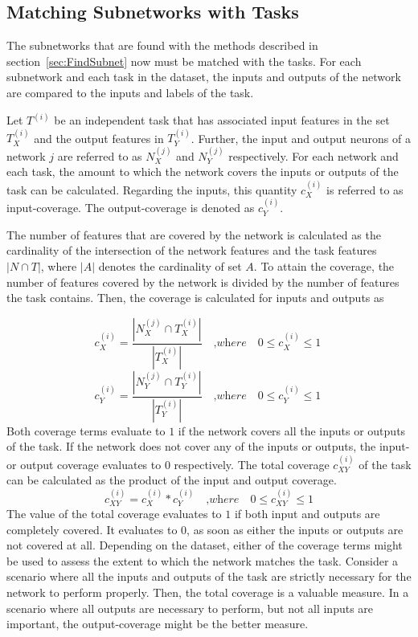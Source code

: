 \subsection{Matching Subnetworks with Tasks}
The subnetworks that are found with the methods described in section~\ref{sec:FindSubnet} now must be matched with the tasks.
For each subnetwork and each task in the dataset, the inputs and outputs of the network are compared to the inputs and labels of the task.

Let $T^{(i)}$ be an independent task that has associated input features in the set $T^{(i)}_X$ and the output features in $T^{(i)}_Y$.
Further, the input and output neurons of a network $j$ are referred to as $N^{(j)}_X$ and $N^{(j)}_Y$ respectively.
For each network and each task, the amount to which the network covers the inputs or outputs of the task can be calculated.
Regarding the inputs, this quantity $c^{(i)}_X$ is referred to as input-coverage. The output-coverage is denoted as $c^{(i)}_Y$.

The number of features that are covered by the network is calculated as the cardinality of the intersection of the network features and the task features $ |N \cap T|$, where  $|A|$ denotes the cardinality of set $A$.
To attain the coverage, the number of features covered by the network is divided by the number of features the task contains.
Then, the coverage is calculated for inputs and outputs as 

\[
c^{(i)}_X = \frac{|N^{(j)}_X  \cap T^{(i)}_X |}{|T^{(i)}_X|} \quad\textit{,where}\quad 0 \leq c^{(i)}_{X} \leq 1\
\]
\[
c^{(i)}_Y = \frac{|N^{(j)}_Y  \cap T^{(i)}_Y |}{|T^{(i)}_Y|} \quad\textit{,where}\quad 0 \leq c^{(i)}_{Y} \leq 1\
\]
Both coverage terms evaluate to $1$ if the network covers all the inputs or outputs of the task.
If the network does not cover any of the inputs or outputs, the input- or output coverage evaluates to $0$ respectively.
The total coverage $c^{(i)}_{XY}$ of the task can be calculated as the product of the input and output coverage.
\[ c^{(i)}_{XY} = c^{(i)}_{X} * c^{(i)}_{Y} \quad\textit{,where}\quad 0 \leq c^{(i)}_{XY} \leq 1\]
The value of the total coverage evaluates to $1$ if both input and outputs are completely covered.
It evaluates to $0$, as soon as either the inputs or outputs are not covered at all.
Depending on the dataset, either of the coverage terms might be used to assess the extent to which the network matches the task.
Consider a scenario where all the inputs and outputs of the task are strictly necessary for the network to perform properly.
Then, the total coverage is a valuable measure.
In a scenario where all outputs are necessary to perform, but not all inputs are important, the output-coverage might be the better measure.

